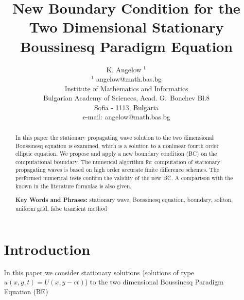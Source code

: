 \documentclass[12pt]{article}
\theoremstyle{theorem}
\theoremstyle{defi}
\begin{document}

\title{New Boundary Condition for the Two Dimensional Stationary Boussinesq Paradigm Equation}

\author{K. Angelow $^1$ \\[6pt]
$^1$ angelow@math.bas.bg\\ 
Institute of Mathematics and Informatics\\
Bulgarian Academy of Sciences, Acad. G.~Bonchev Bl.8\\
Sofia - 1113, Bulgaria\\
e-mail: angelow@math.bas.bg\\[6pt] }

\maketitle

\begin{abstract}

In this paper the stationary propagating wave solution to the two dimensional Boussinesq equation is examined, which is a solution to a nonlinear fourth order elliptic equation.  We propose and apply a new boundary condition (BC) on the computational boundary. The numerical algorithm for computation of stationary propagating waves is based on high order accurate finite difference schemes. The performed numerical tests confirm the validity of the new BC. A comparison with the known in the literature formulas is also given. 

\medskip


{\bf Key Words and Phrases:} stationary wave, Boussinesq equation, boundary, soliton, uniform grid, false transient method

\end{abstract}

\section{Introduction}
In this paper we consider stationary solutions (solutions of type  $u(x,y,t)=U(x,y - ct)$) to the two dimensional Boussinesq Paradigm Equation (BE) 
\end{document}
